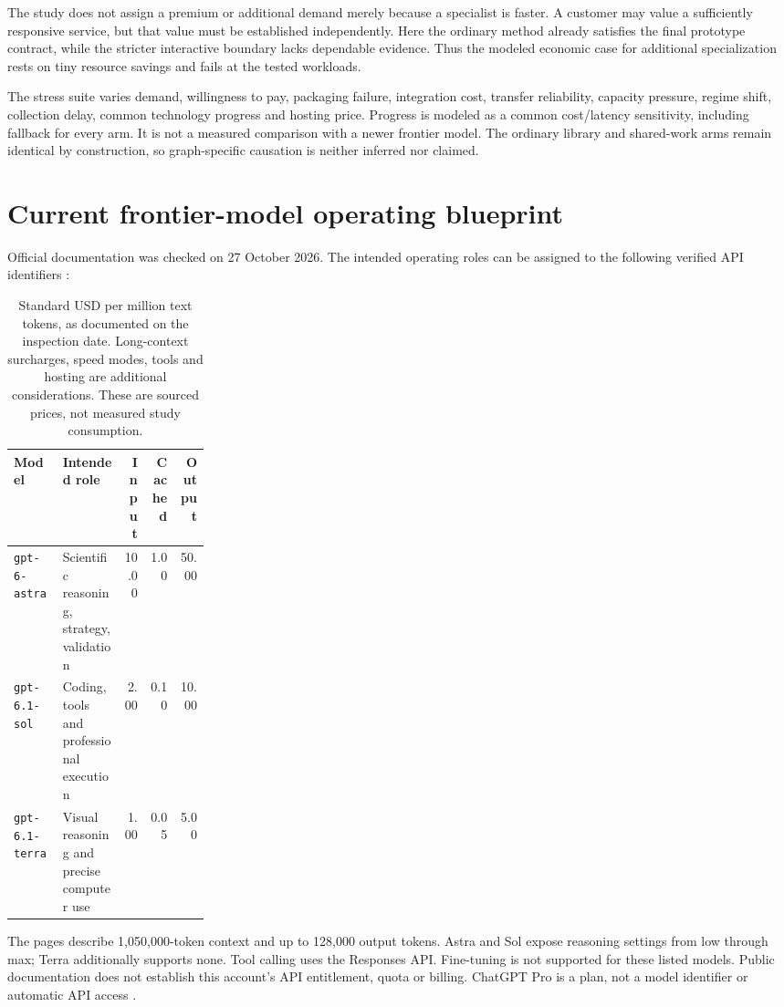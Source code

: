 \documentclass[11pt,letterpaper]{article}
\begin{document}
The study does not assign a premium or additional demand merely because a specialist is faster. A customer may value a sufficiently responsive service, but that value must be established independently. Here the ordinary method already satisfies the final prototype contract, while the stricter interactive boundary lacks dependable evidence. Thus the modeled economic case for additional specialization rests on tiny resource savings and fails at the tested workloads.

The stress suite varies demand, willingness to pay, packaging failure, integration cost, transfer reliability, capacity pressure, regime shift, collection delay, common technology progress and hosting price. Progress is modeled as a common cost/latency sensitivity, including fallback for every arm. It is not a measured comparison with a newer frontier model. The ordinary library and shared-work arms remain identical by construction, so graph-specific causation is neither inferred nor claimed.

\section{Current frontier-model operating blueprint}

Official documentation was checked on 27 October 2026. The intended operating roles can be assigned to the following verified API identifiers \cite{astra,sol,terra,pricing}:

\begin{table}[htbp]\centering\small
\begin{tabularx}{\linewidth}{p{0.25\linewidth}Yrrr}\toprule
Model & Intended role & Input & Cached & Output\\\midrule
\texttt{gpt-6-astra} & Scientific reasoning, strategy, validation &10.00&1.00&50.00\\
\texttt{gpt-6.1-sol} & Coding, tools and professional execution &2.00&0.10&10.00\\
\texttt{gpt-6.1-terra} & Visual reasoning and precise computer use &1.00&0.05&5.00\\\bottomrule
\end{tabularx}
\caption{Standard USD per million text tokens, as documented on the inspection date. Long-context surcharges, speed modes, tools and hosting are additional considerations. These are sourced prices, not measured study consumption.}
\end{table}

The pages describe 1,050,000-token context and up to 128,000 output tokens. Astra and Sol expose reasoning settings from low through max; Terra additionally supports none. Tool calling uses the Responses API. Fine-tuning is not supported for these listed models. Public documentation does not establish this account's API entitlement, quota or billing. ChatGPT Pro is a plan, not a model identifier or automatic API access \cite{chatgpt}.
\end{document}
